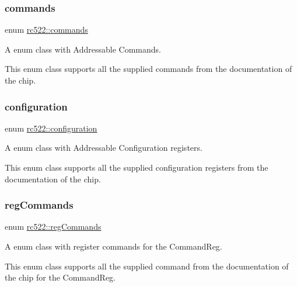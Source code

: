 \subsubsection{\texorpdfstring{commands}{commands}}
{\footnotesize\ttfamily enum \hyperlink{classrc522_a6df2359c88d6c2f47faf58bc9e09eaa4}{rc522\+::commands}\hspace{0.3cm}{\ttfamily [strong]}}



A enum class with Addressable Commands. 

This enum class supports all the supplied commands from the documentation of the chip. \mbox{\label{classrc522_afcf27c8198d017cd4e8173c7d7a6fded}} 
\subsubsection{\texorpdfstring{configuration}{configuration}}
{\footnotesize\ttfamily enum \hyperlink{classrc522_afcf27c8198d017cd4e8173c7d7a6fded}{rc522\+::configuration}\hspace{0.3cm}{\ttfamily [strong]}}



A enum class with Addressable Configuration registers. 

This enum class supports all the supplied configuration registers from the documentation of the chip. \mbox{\label{classrc522_a3a205976fb9b7265bc5b7971215fbb7c}} 
\subsubsection{\texorpdfstring{reg\+Commands}{regCommands}}
{\footnotesize\ttfamily enum \hyperlink{classrc522_a3a205976fb9b7265bc5b7971215fbb7c}{rc522\+::reg\+Commands}\hspace{0.3cm}{\ttfamily [strong]}}



A enum class with register commands for the Command\+Reg. 

This enum class supports all the supplied command from the documentation of the chip for the Command\+Reg. \mbox{\label{classrc522_a83057db5f8fefa3dc9a6e8e5f0e191ee}} 
